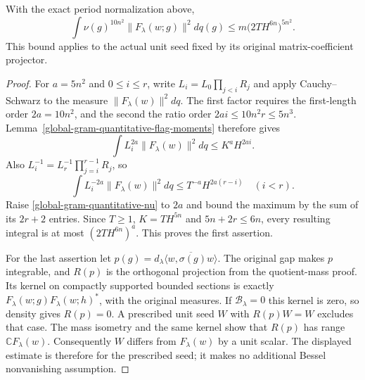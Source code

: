 \begin{theorem}
\label{global-gram-quantitative-moment}
With the exact period normalization above,
\begin{equation}\label{global-gram-quantitative-moment-bound}
 \int\nu(g)^{10n^2}\|F_\lambda(w;g)\|^2dq(g)
       \le m\bigl(2T H^{6n}\bigr)^{5n^2}.
\end{equation}
This bound applies to the actual unit seed fixed by its original
matrix-coefficient projector.
\end{theorem}
\begin{proof}
For $a=5n^2$ and $0\le i\le r$, write
$L_i=L_0\prod_{j<i}R_j$ and apply Cauchy--Schwarz to the
measure $\|F_\lambda(w)\|^2dq$.  The first factor requires the
first-length order $2a=10n^2$, and the second the ratio order
$2ai\le10n^2r\le5n^3$.  Lemma~\ref{global-gram-quantitative-flag-moments}
therefore gives
\[
 \int L_i^{2a}\|F_\lambda(w)\|^2dq\le K^aH^{2ai}.
\]
Also $L_i^{-1}=L_r^{-1}\prod_{j=i}^{r-1}R_j$, so
\[
 \int L_i^{-2a}\|F_\lambda(w)\|^2dq
       \le T^{-a}H^{2a(r-i)}\quad(i<r).
\]
Raise \eqref{global-gram-quantitative-nu} to $2a$ and bound the
maximum by the sum of its $2r+2$ entries.  Since $T\ge1$,
$K=TH^{5n}$ and $5n+2r\le6n$, every resulting integral is at
most $(2TH^{6n})^a$.  This proves the first assertion.

For the last assertion let
$p(g)=d_\lambda\overline{\langle w,\sigma(g)w\rangle}$.
The original gap makes $p$ integrable, and $R(p)$ is the
orthogonal projection from the quotient-mass proof.
Its kernel on compactly supported bounded sections is exactly
$F_\lambda(w;g)F_\lambda(w;h)^*$, with the original measures.
If $\mathcal B_\lambda=0$ this kernel is zero, so density gives
$R(p)=0$.  A prescribed unit seed $W$ with $R(p)W=W$ excludes
that case.  The mass isometry and the same kernel show that
$R(p)$ has range $\mathbb C F_\lambda(w)$.
Consequently $W$ differs from $F_\lambda(w)$ by a unit scalar.
The displayed estimate is therefore for the prescribed seed;
it makes no additional Bessel nonvanishing assumption.
\end{proof}

